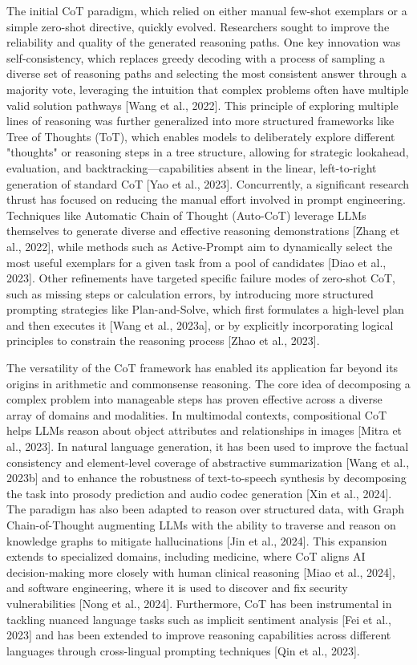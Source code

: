\documentclass[11pt]{article}
\begin{document}
The initial CoT paradigm, which relied on either manual few-shot exemplars or a simple zero-shot directive, quickly evolved. Researchers sought to improve the reliability and quality of the generated reasoning paths. One key innovation was self-consistency, which replaces greedy decoding with a process of sampling a diverse set of reasoning paths and selecting the most consistent answer through a majority vote, leveraging the intuition that complex problems often have multiple valid solution pathways [Wang et al., 2022]. This principle of exploring multiple lines of reasoning was further generalized into more structured frameworks like Tree of Thoughts (ToT), which enables models to deliberately explore different "thoughts" or reasoning steps in a tree structure, allowing for strategic lookahead, evaluation, and backtracking—capabilities absent in the linear, left-to-right generation of standard CoT [Yao et al., 2023]. Concurrently, a significant research thrust has focused on reducing the manual effort involved in prompt engineering. Techniques like Automatic Chain of Thought (Auto-CoT) leverage LLMs themselves to generate diverse and effective reasoning demonstrations [Zhang et al., 2022], while methods such as Active-Prompt aim to dynamically select the most useful exemplars for a given task from a pool of candidates [Diao et al., 2023]. Other refinements have targeted specific failure modes of zero-shot CoT, such as missing steps or calculation errors, by introducing more structured prompting strategies like Plan-and-Solve, which first formulates a high-level plan and then executes it [Wang et al., 2023a], or by explicitly incorporating logical principles to constrain the reasoning process [Zhao et al., 2023].

The versatility of the CoT framework has enabled its application far beyond its origins in arithmetic and commonsense reasoning. The core idea of decomposing a complex problem into manageable steps has proven effective across a diverse array of domains and modalities. In multimodal contexts, compositional CoT helps LLMs reason about object attributes and relationships in images [Mitra et al., 2023]. In natural language generation, it has been used to improve the factual consistency and element-level coverage of abstractive summarization [Wang et al., 2023b] and to enhance the robustness of text-to-speech synthesis by decomposing the task into prosody prediction and audio codec generation [Xin et al., 2024]. The paradigm has also been adapted to reason over structured data, with Graph Chain-of-Thought augmenting LLMs with the ability to traverse and reason on knowledge graphs to mitigate hallucinations [Jin et al., 2024]. This expansion extends to specialized domains, including medicine, where CoT aligns AI decision-making more closely with human clinical reasoning [Miao et al., 2024], and software engineering, where it is used to discover and fix security vulnerabilities [Nong et al., 2024]. Furthermore, CoT has been instrumental in tackling nuanced language tasks such as implicit sentiment analysis [Fei et al., 2023] and has been extended to improve reasoning capabilities across different languages through cross-lingual prompting techniques [Qin et al., 2023].
\end{document}
